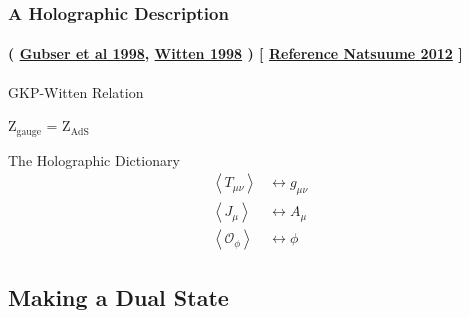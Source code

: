 \documentclass[aspectratio=169, xcolor=dvipsnames]{beamer}
\begin{document}
\begin{frame}
  \frametitle{A Holographic Description }
  \framesubtitle{
    (
    \href{https://inspirehep.net/literature/467202}{Gubser et al 1998},
    \href{https://inspirehep.net/literature/467400}{Witten 1998}
  ) [ \href{https://inspirehep.net/literature/1316320}{Reference Natsuume 2012} ]}
  \begin{block}{GKP-Witten Relation}
    \begin{center}Z$_\text{gauge}$ = Z$_\text{AdS}$\end{center}
  \end{block}

  \begin{block}{The Holographic Dictionary}
    \begin{align*}
      \left\langle T_{\mu\nu}\right\rangle &\longleftrightarrow g_{\mu\nu}\\
      \left\langle J_{\mu}\right\rangle &\longleftrightarrow A_{\mu}\\
      \left\langle\mathcal O_\phi\right\rangle &\longleftrightarrow \phi
    \end{align*}
  \end{block}


\end{frame}

\subsection{Making a Dual State}
\end{document}
